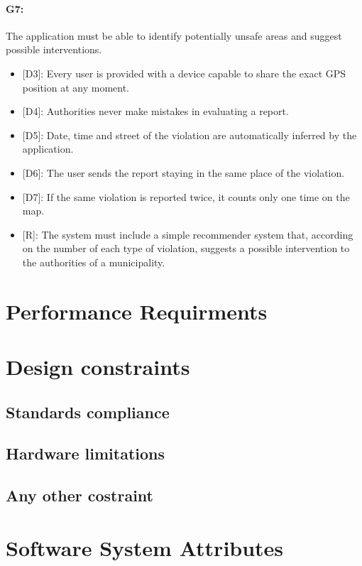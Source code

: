 \documentclass[12pt,a4paper]{report}
\begin{document}
			\paragraph {G7:} The application must be able to identify potentially unsafe areas and suggest possible interventions.
		\begin{itemize}
			\item{[D3]:} Every user is provided with a device capable to share the exact GPS position at any moment.
	 		\item{[D4]:} Authorities never make mistakes in evaluating a report.
			\item{[D5]:} Date, time and street of the violation are automatically inferred by the application.
	 		\item{[D6]:} The user sends the report staying in the same place of the violation.
			\item{[D7]:} If the same violation is reported twice, it counts only one time on the map.
		\end{itemize}
		\begin{itemize}
			\item{[R]:} The system must include a simple recommender system that, according on the number of each type of violation, suggests a possible intervention to the authorities of a municipality.
		\end{itemize}
	
	\section{Performance Requirments}
	\section{Design constraints}
		\subsection{Standards compliance}
		\subsection{Hardware limitations}
		\subsection{Any other costraint}
	\section{Software System Attributes}
\end{document}

